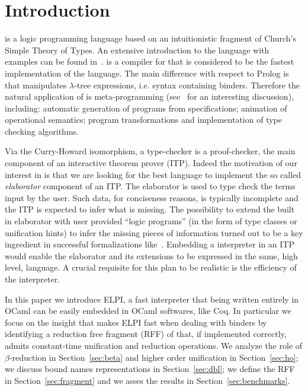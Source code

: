 \documentclass{llncs}
\begin{document}
\section{Introduction}%
\lp{} is a logic programming language based on an intuitionistic fragment of
Church's Simple Theory of Types. An extensive introduction to the language
with examples can be found in~\cite{Miller:2012:PHL:2331097}. \tedius{}
\cite{DBLP:conf/cade/NadathurM99,DBLP:journals/corr/abs-0911-5203} is a
compiler for \lp{} %
that is considered to be the fastest
implementation of the language. 
The main difference with respect to Prolog is that \lp{} manipulates
$\lambda$-tree expressions, i.e. syntax containing binders. Therefore the
natural application of \lp{} is meta-programming (see~\cite{LPAZ} for
an interesting discussion), including: automatic generation of programs from
specifications; animation of operational semantics;
program transformations and implementation of type checking algorithms.

Via the Curry-Howard isomorphism, a type-checker is a proof-checker, the main
component of an interactive theorem prover (ITP). Indeed the motivation of our
interest in \lp{} is that we are looking for the best 
language to implement the so called \emph{elaborator} component of an ITP.
The elaborator is used to type check the terms input by
the user.  Such data, for conciseness reasons, is typically incomplete and
the ITP is expected to infer what is missing.  The possibility to
extend the built in elaborator with user provided ``logic programs'' (in the
form of type classes or unification hints) to infer the missing pieces of
information turned out to be a key ingredient in successful formalizations
like~\cite{gonthier:hal-00816699}.  Embedding a \lp{} interpreter in an ITP 
would enable the elaborator and its extensions to be expressed in the same,
high level, language.  A crucial requisite for this plan to be realistic is
the efficiency of the \lp{} interpreter.

In this paper we introduce ELPI, a fast \lp{} interpreter that being written
entirely in OCaml can be easily embedded in OCaml softwares, like Coq.
In particular we focus on the insight that makes ELPI fast when dealing with
binders by identifying a reduction free fragment (RFF) of \lp{} that, if
implemented correctly, admits constant-time unification and reduction
operations.
We analyze the role  of $\beta$-reduction in Section~\ref{sec:beta} and
higher order unification in Section~\ref{sec:ho}; we discuss bound names
representations in Section~\ref{sec:dbl}; we define the RFF 
in Section~\ref{sec:fragment} and we asses the results in
Section~\ref{sec:benchmarks}.
\end{document}
